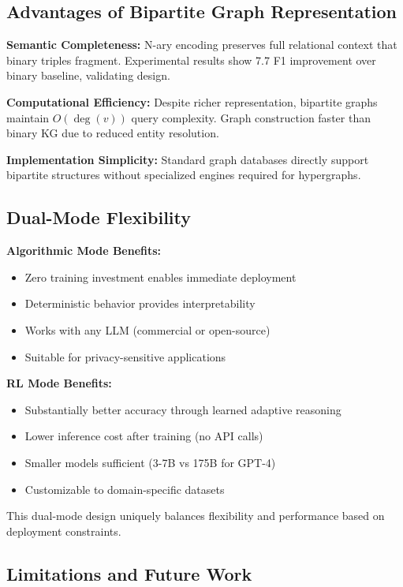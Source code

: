 \documentclass[11pt,a4paper]{article}
\begin{document}
\subsection{Advantages of Bipartite Graph Representation}

\textbf{Semantic Completeness:} N-ary encoding preserves full relational context that binary triples fragment. Experimental results show 7.7 F1 improvement over binary baseline, validating design.

\textbf{Computational Efficiency:} Despite richer representation, bipartite graphs maintain $O(\deg(v))$ query complexity. Graph construction faster than binary KG due to reduced entity resolution.

\textbf{Implementation Simplicity:} Standard graph databases directly support bipartite structures without specialized engines required for hypergraphs.

\subsection{Dual-Mode Flexibility}

\textbf{Algorithmic Mode Benefits:}
\begin{itemize}
    \item Zero training investment enables immediate deployment
    \item Deterministic behavior provides interpretability
    \item Works with any LLM (commercial or open-source)
    \item Suitable for privacy-sensitive applications
\end{itemize}

\textbf{RL Mode Benefits:}
\begin{itemize}
    \item Substantially better accuracy through learned adaptive reasoning
    \item Lower inference cost after training (no API calls)
    \item Smaller models sufficient (3-7B vs 175B for GPT-4)
    \item Customizable to domain-specific datasets
\end{itemize}

This dual-mode design uniquely balances flexibility and performance based on deployment constraints.

\subsection{Limitations and Future Work}
\end{document}
